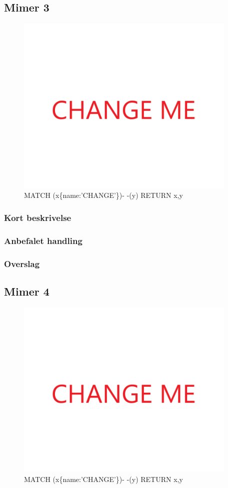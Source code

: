 \documentclass{article}
\begin{document}
\subsection{Mimer 3}
\begin{figure}[h]
\includegraphics[width=300pt]{CHANGE.PNG}
\caption{MATCH (x\{name:'CHANGE'\})- -(y) RETURN x,y}
\end{figure}
\subsubsection{Kort beskrivelse}
\subsubsection{Anbefalet handling}
\subsubsection{Overslag}


\subsection{Mimer 4}
\begin{figure}[h]
\includegraphics[width=300pt]{CHANGE.PNG}
\caption{MATCH (x\{name:'CHANGE'\})- -(y) RETURN x,y}
\end{figure}
\end{document}
